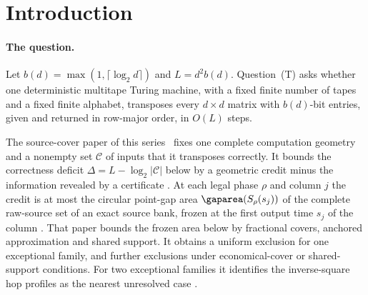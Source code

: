 \section{Introduction}\label{sec:introduction}

\paragraph{The question.}
Let $b(d)=\max(1,\lceil\log_2d\rceil)$ and $L=d^2b(d)$. Question~(T) asks whether one
deterministic multitape Turing machine, with a fixed finite number of tapes and a
fixed finite alphabet, transposes every $d\times d$ matrix with $b(d)$-bit entries,
given and returned in row-major order, in $O(L)$ steps.

The source-cover paper of this series~\cite{SourceCovers2026} fixes one complete
computation geometry and a nonempty set $\mathcal C$ of inputs that it transposes
correctly. It bounds the correctness deficit $\Delta=L-\log_2|\mathcal C|$ below by a
geometric credit minus the information revealed by a certificate
\cite[Theorem~3.5]{SourceCovers2026}. At each legal phase $\rho$ and column $j$ the
credit is at most the circular point-gap area $\gaparea(S_\rho(s_j))$ of the complete
raw-source set of an exact source bank, frozen at the first output time $s_j$ of the
column \cite[Theorems~2.7 and~2.9]{SourceCovers2026}. That paper bounds the frozen area
below by fractional covers, anchored approximation and shared support. It obtains a
uniform exclusion for one exceptional family, and further exclusions under
economical-cover or shared-support conditions. For two exceptional families it
identifies the inverse-square hop profiles as the nearest unresolved case
\cite[Section~9.1]{SourceCovers2026}.

